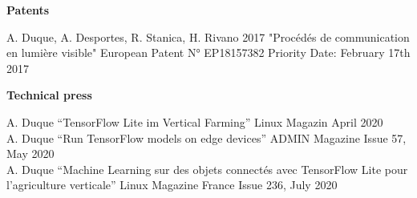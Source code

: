 \documentclass[]{cv-style}          %
\begin{document}
\large{\textbf{Patents}}

\normalsize
\begin{publist}
\pat
{A. Duque, A. Desportes,  R. Stanica, H. Rivano}
{2017}
{"Procédés de communication en lumière visible"}
{European Patent N° EP18157382}
{Priority Date: February 17th 2017}
\\
\end{publist}
\newpage
\large{\textbf{Technical press}}

\normalsize
\begin{publist}
\pub
  {A. Duque} {“TensorFlow Lite im Vertical Farming”} {Linux Magazin } {April 2020}\\
\pub
  {A. Duque} {“Run TensorFlow models on edge devices”} {ADMIN Magazine} {Issue 57, May 2020}\\
\pub
  {A. Duque} {“Machine Learning sur des objets connectés avec TensorFlow Lite pour l’agriculture verticale”} {Linux Magazine France} {Issue 236, July 2020}
  
\end{publist}





\end{document}

